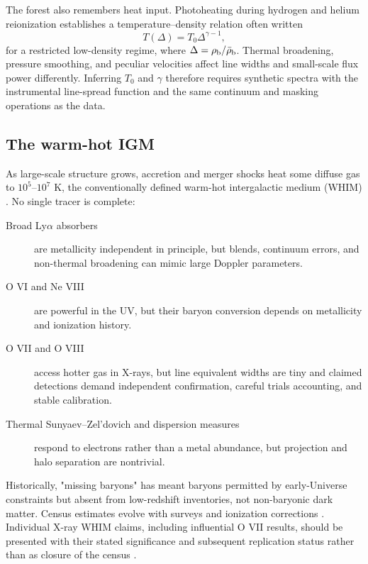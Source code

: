 The forest also remembers heat input. Photoheating during hydrogen and
helium reionization establishes a temperature--density relation often written
\begin{equation}
 T(\Delta)=T_0\Delta^{\gamma-1},
\end{equation}
for a restricted low-density regime, where
$\Delta=\rho_{\rm b}/\bar{\rho}_{\rm b}$. Thermal broadening, pressure
smoothing, and peculiar velocities affect line widths and small-scale flux
power differently. Inferring $T_0$ and $\gamma$ therefore requires synthetic
spectra with the instrumental line-spread function and the same continuum and
masking operations as the data.

\subsection{The warm-hot IGM}

As large-scale structure grows, accretion and merger shocks heat some diffuse
gas to $10^{5}$--$10^{7}$ K, the conventionally defined warm-hot
intergalactic medium (WHIM) \citep{CenOstriker1999,Dave2001}. No single tracer
is complete:
\begin{description}
  \item[Broad Ly$\alpha$ absorbers] are metallicity independent in principle,
  but blends, continuum errors, and non-thermal broadening can mimic large
  Doppler parameters.
  \item[O VI and Ne VIII] are powerful in the UV, but their baryon conversion
  depends on metallicity and ionization history.
  \item[O VII and O VIII] access hotter gas in X-rays, but line equivalent
  widths are tiny and claimed detections demand independent confirmation,
  careful trials accounting, and stable calibration.
  \item[Thermal Sunyaev--Zel'dovich and dispersion measures] respond to
  electrons rather than a metal abundance, but projection and halo separation
  are nontrivial.
\end{description}
Historically, "missing baryons" has meant baryons permitted by early-Universe
constraints but absent from low-redshift inventories, not non-baryonic dark
matter. Census estimates evolve with surveys and ionization corrections
\citep{Bregman2007,Shull2012,PerouxHowk2020}. Individual X-ray WHIM claims,
including influential O VII results, should be presented with their stated
significance and subsequent replication status rather than as closure of the
census \citep{Nicastro2018}.

